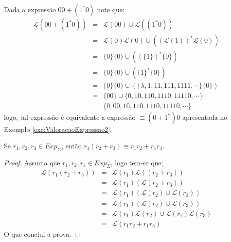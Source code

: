 \begin{example}
	Dada a expressão $00 + (1^*0)$ note que:
	\begin{eqnarray*}
		\mathcal{L}(00 + (1^*0)) & = &\mathcal{L}(00) \cup \mathcal{L}((1^*0))\\
		& = & \mathcal{L}(0)\mathcal{L}(0) \cup ((\mathcal{L}(1))^*\mathcal{L}(0))\\
		& = & \{0\}\{0\} \cup ((\{1\})^*\{0\})\\
		& = & \{0\}\{0\} \cup (\{1\}^*\{0\})\\
		& = & \{0\}\{0\} \cup (\{\lambda, 1, 11, 111, 1111, \cdots\}\{0\})\\
		& = & \{00\} \cup \{0, 10, 110, 1110, 11110, \cdots\}\\
		& = & \{0, 00, 10, 110, 1110, 11110, \cdots\}
	\end{eqnarray*}
	logo, tal expressão é equivalente a expressão  $\equiv (0 + 1^*)0$ apresentada no Exemplo \ref{exe:ValoracaoExpressao2}. 
\end{example}

\begin{proposition}
	Se $r_1, r_2, r_3 \in Exp_\Sigma$, então $r_1 (r_2 + r_3) \equiv r_1r_2 + r_1r_3$.
\end{proposition}

\begin{proof}
	Assuma que $r_1, r_2, r_3 \in Exp_\Sigma$, logo tem-se que;
	\begin{eqnarray*}
		\mathcal{L}(r_1 (r_2 + r_3)) & = & \mathcal{L}(r_1)\mathcal{L}((r_2 + r_3))\\
		& = & \mathcal{L}(r_1)(\mathcal{L}(r_2 + r_3))\\
		& = & \mathcal{L}(r_1)(\mathcal{L}(r_2) \cup  \mathcal{L}(r_3))\\ 
		& = & \mathcal{L}(r_1)(\mathcal{L}(r_2) \cup  \mathcal{L}(r_3))\\ 
		& = & \mathcal{L}(r_1)\mathcal{L}(r_2) \cup  \mathcal{L}(r_1)\mathcal{L}(r_3)\\ 
		& = & \mathcal{L}(r_1r_2 + r_1r_3)
	\end{eqnarray*}
	O que conclui a prova.
\end{proof}

